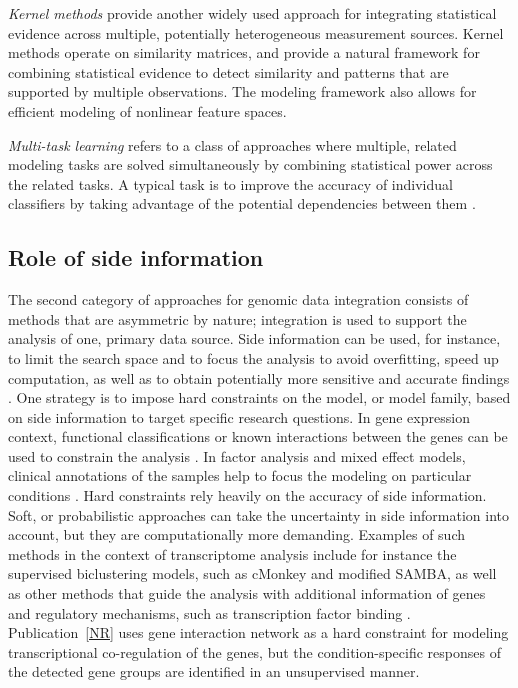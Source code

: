 {\it Kernel methods} \citep[see e.g.][]{Scholkopf02} provide another
widely used approach for integrating statistical evidence across
multiple, potentially heterogeneous measurement sources. Kernel
methods operate on similarity matrices, and provide a natural
framework for combining statistical evidence to detect similarity and
patterns that are supported by multiple observations. The modeling
framework also allows for efficient modeling of nonlinear feature
spaces.

{\it Multi-task learning} refers to a class of approaches where
multiple, related modeling tasks are solved simultaneously by
combining statistical power across the related tasks. A typical task
is to improve the accuracy of individual classifiers by taking
advantage of the potential dependencies between them \citep[see
e.g.][]{Caruana97}.


\subsection{Role of side information}

The second category of approaches for genomic data integration
consists of methods that are asymmetric by nature; integration is used
to support the analysis of one, primary data source. Side information
can be used, for instance, to limit the search space and to focus the
analysis to avoid overfitting, speed up computation, as well as to
obtain potentially more sensitive and accurate findings \citep[see
e.g.][]{Eisenstein06}. One strategy is to impose hard constraints on
the model, or model family, based on side information to target
specific research questions. In gene expression context, functional
classifications or known interactions between the genes can be used to
constrain the analysis \citep{Goeman07, Ulitsky09}. In factor analysis
and mixed effect models, clinical annotations of the samples help to
focus the modeling on particular conditions \citep[see
e.g.][]{Carvalho08}. Hard constraints rely heavily on the accuracy of
side information. Soft, or probabilistic approaches can take the
uncertainty in side information into account, but they are
computationally more demanding. Examples of such methods in the
context of transcriptome analysis include for instance the supervised
biclustering models, such as cMonkey and modified SAMBA, as well as
other methods that guide the analysis with additional information of
genes and regulatory mechanisms, such as transcription factor binding
\citep{Reiss06, Savage2010, Tanay04}. Publication~\ref{NR} uses gene
interaction network as a hard constraint for modeling transcriptional
co-regulation of the genes, but the condition-specific responses of
the detected gene groups are identified in an unsupervised manner.

